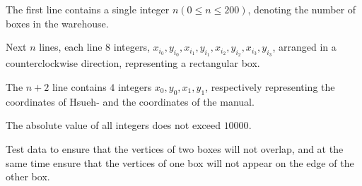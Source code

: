 The first line contains a single integer $n(0 \leq n \leq 200)$, denoting the number of boxes in the warehouse.

Next $n$ lines, each line $8$ integers, $x_{i_0},y_{i_0},x_{i_1},y_{i_1},x_{i_2},y_{i_2},x_{i_3}, y_{i_3}$, arranged in a counterclockwise direction, representing a rectangular box.

The $n + 2$ line contains $4$ integers $x_0, y_0, x_1, y_1$, respectively representing the coordinates of Hsueh- and the coordinates of the manual.

The absolute value of all integers does not exceed $10000$.

Test data to ensure that the vertices of two boxes will not overlap, and at the same time ensure that the vertices of one box will not appear on the edge of the other box.
